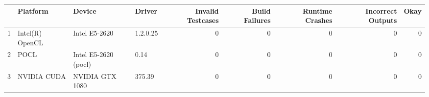 \begin{tabular}{llllrrrrr}
\toprule
{} &         Platform &                Device &    Driver &  Invalid Testcases &  Build Failures &  Runtime Crashes &  Incorrect Outputs &  Okay \\
\midrule
1 &  Intel(R) OpenCL &         Intel E5-2620 &  1.2.0.25 &                  0 &               0 &                0 &                  0 &     0 \\
2 &             POCL &  Intel E5-2620 (pocl) &      0.14 &                  0 &               0 &                0 &                  0 &     0 \\
3 &      NVIDIA CUDA &       NVIDIA GTX 1080 &    375.39 &                  0 &               0 &                0 &                  0 &     0 \\
\bottomrule
\end{tabular}
